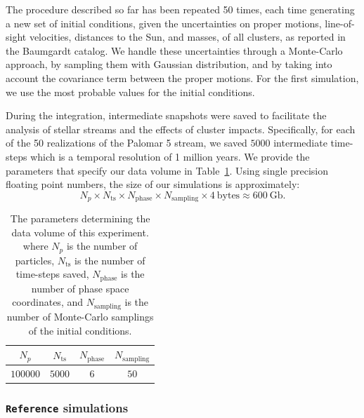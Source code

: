 \documentclass{aa}
\begin{document}
      The procedure described so far has been repeated 50 times, each time generating a new set of initial conditions, given the uncertainties on proper motions, line-of-sight velocities, distances to the Sun, and masses, of all clusters, as reported in the Baumgardt catalog. We handle these uncertainties  through a Monte-Carlo approach, by sampling them with Gaussian distribution, and by taking into account the covariance term between the proper motions. For the first simulation, we use the most probable values for the initial conditions. 


      During the integration, intermediate snapshots were saved to facilitate the analysis of stellar streams and the effects of cluster impacts. Specifically, for each of the 50 realizations of the Palomar 5 stream, we saved $5000$ intermediate time-steps which is a temporal resolution of 1 million years. We provide the parameters that specify our data volume in Table~\ref{tab:data_volume}. Using single precision floating point numbers, the size of our simulations is approximately:
    \begin{equation} \label{eq:data_volume_estimate}
      N_p \times N_{\textrm{ts}}\times N_{\textrm{phase}}\times N_{\textrm{sampling}} \times 4~\textrm{bytes}\approx 600~\textrm{Gb}.
    \end{equation}

    \begin{table}[h]
      \centering
      \begin{tabular}{|c|c|c|c|}
          \hline
          $N_p$ & $N_{\textrm{ts}}$ & $N_{\textrm{phase}}$ & $N_{\textrm{sampling}}$ \\
          \hline
          $100000$ & $5000$ & $6$ & $50$ \\
          \hline
      \end{tabular}
      \caption{The parameters determining the data volume of this experiment. where $N_p$  is the number of particles, $N_{\textrm{ts}}$ is the number of time-steps saved, $N_{\textrm{phase}}$ is the number of phase space coordinates, and $N_{\textrm{sampling}}$ is the number of Monte-Carlo samplings of the initial conditions.}
      \label{tab:data_volume}
    \end{table}

  \subsubsection*{ \texttt{Reference} simulations}
\end{document}
